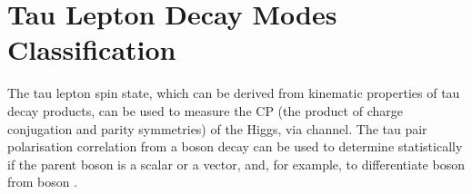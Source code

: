 \chapter{Tau Lepton Decay Modes Classification}
\label{chap:Tau}

%
{}%

The tau lepton spin state, which can be derived from kinematic properties of tau decay products, can be used to measure the CP (the product of charge conjugation and parity symmetries) of the Higgs, via \HiggsToTauTau channel\cite{Berge:2015nua}. The tau pair polarisation correlation from a boson decay can be used to determine statistically if the parent boson is a  scalar or a vector, and, for example, to differentiate \PH boson from  \PZ boson \cite{Bullock:1991my}.

